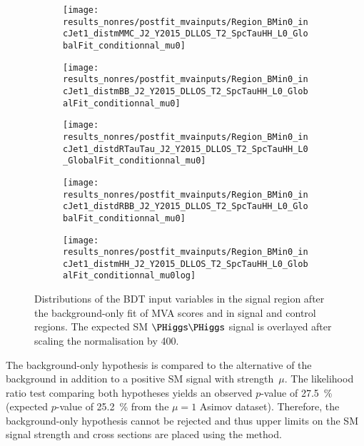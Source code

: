 \begin{figure}[htbp]
  \centering

  \begin{subfigure}{0.46\textwidth}
    \texttt{[image: results\_nonres/postfit\_mvainputs/Region\_BMin0\_incJet1\_distmMMC\_J2\_Y2015\_DLLOS\_T2\_SpcTauHH\_L0\_GlobalFit\_conditionnal\_mu0]}
  \end{subfigure}\hfill%
  \begin{subfigure}{0.46\textwidth}
    \texttt{[image: results\_nonres/postfit\_mvainputs/Region\_BMin0\_incJet1\_distmBB\_J2\_Y2015\_DLLOS\_T2\_SpcTauHH\_L0\_GlobalFit\_conditionnal\_mu0]}
  \end{subfigure}

  \begin{subfigure}{0.46\textwidth}
    \texttt{[image: results\_nonres/postfit\_mvainputs/Region\_BMin0\_incJet1\_distdRTauTau\_J2\_Y2015\_DLLOS\_T2\_SpcTauHH\_L0\_GlobalFit\_conditionnal\_mu0]}
  \end{subfigure}\hfill%
  \begin{subfigure}{0.46\textwidth}
    \texttt{[image: results\_nonres/postfit\_mvainputs/Region\_BMin0\_incJet1\_distdRBB\_J2\_Y2015\_DLLOS\_T2\_SpcTauHH\_L0\_GlobalFit\_conditionnal\_mu0]}
  \end{subfigure}

  \begin{subfigure}{0.46\textwidth}
    \texttt{[image: results\_nonres/postfit\_mvainputs/Region\_BMin0\_incJet1\_distmHH\_J2\_Y2015\_DLLOS\_T2\_SpcTauHH\_L0\_GlobalFit\_conditionnal\_mu0log]}
  \end{subfigure}

  \caption{Distributions of the BDT input variables in the \hadhad
    signal region after the background-only fit of MVA scores and \mll
    in signal and control regions. The expected SM $\HH$ signal is
    overlayed after scaling the normalisation by 400.}
\end{figure}





The background-only hypothesis is compared to the alternative of the
background in addition to a positive SM \HH signal with
strength~$\mu$. The likelihood ratio test comparing both hypotheses
yields an observed $p$-value of \SI{27.5}{\percent} (expected
$p$-value of \SI{25.2}{\percent} from the $\mu = 1$ Asimov
dataset). Therefore, the background-only hypothesis cannot be rejected
and thus upper limits on the SM \HH signal strength and cross sections
are placed using the \CLs method.



